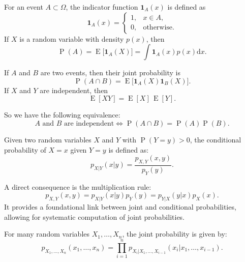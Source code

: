\documentclass[10pt, headings=standardclasses, parskip=half, twoside]{scrartcl}
\newcommand{\dif}{\mathrm{d}}
\newcommand{\Exp}{\operatorname{E}}
\newcommand{\Prob}{\operatorname{P}}
\begin{document}

\begin{definition}\label{def:indicator}
For an event \(A\subset \Omega\), the indicator function \(\mathbf{1}_A(x)\) is defined as
\[
\mathbf{1}_A(x)=
\begin{cases}
1, & x\in A,\\[1mm]
0, & \text{otherwise}.
\end{cases}
\]
If \(X\) is a random variable with density \(p(x)\), then
\[
\Prob(A)=\Exp\bigl[\mathbf{1}_A(X)\bigr]=\int \mathbf{1}_A(x)p(x)\dif x.
\]
\end{definition}

If \(A\) and \(B\) are two events, then their joint probability is
\[
\Prob(A\cap B)=\Exp\bigl[\mathbf{1}_A(X)\mathbf{1}_B(X)\bigr].
\]
If \(X\) and \(Y\) are independent, then
\[
\Exp[XY]=\Exp[X]\,\Exp[Y].
\]

So we have the following equivalence:
\[
\text{$A$ and $B$ are independent} \iff \Prob(A\cap B)=\Prob(A)\Prob(B) \text{.}
\]

\begin{definition}\label{def:condprob}
Given two random variables \(X\) and \(Y\) with \(\Prob(Y=y)>0\), the conditional probability of \(X=x\) given \(Y=y\) is defined as:
\[
p_{X|Y}(x|y)=\frac{p_{X,Y}(x,y)}{p_Y(y)}.
\]
\end{definition}

A direct consequence is the multiplication rule:
\[
p_{X,Y}(x,y)=p_{X|Y}(x|y)p_Y(y)=p_{Y|X}(y|x)p_X(x).
\]
It provides a foundational link between joint and conditional probabilities, allowing for systematic computation of joint probabilities.

For many random variables \(X_1,\ldots,X_n\), the joint probability is given by:
\begin{equation}
\label{eq:joint_density_many}
p_{X_1,\ldots,X_n}(x_1,\ldots,x_n)=\prod_{i=1}^n p_{X_i|X_1,\ldots,X_{i-1}}(x_i|x_1,\ldots,x_{i-1}).
\end{equation}
\end{document}
